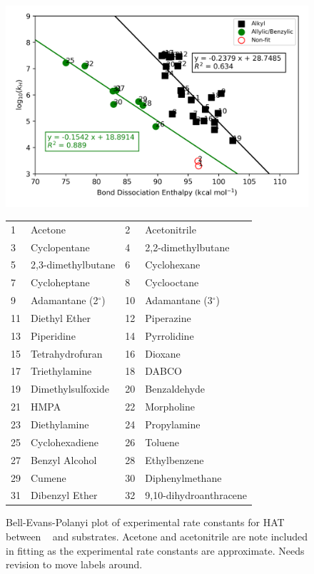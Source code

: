 \begin{figure}[htb]
  \centering
  \includegraphics[width=\textwidth]{figures/bde-bep}
\begin{tabularx}{\textwidth}{| l X l X |}
  \hline
  1 & Acetone & 2 & Acetonitrile \\
  3 & Cyclopentane & 4 & 2,2-dimethylbutane \\
  5 & 2,3-dimethylbutane & 6 & Cyclohexane \\
  7 & Cycloheptane & 8 & Cyclooctane \\
  9 & Adamantane (2$^\circ$) & 10 & Adamantane (3$^\circ$) \\
  11 & Diethyl Ether & 12 & Piperazine \\
  13 & Piperidine & 14 & Pyrrolidine \\
  15 & Tetrahydrofuran & 16 & Dioxane \\
  17 & Triethylamine & 18 & DABCO \\
  19 & Dimethylsulfoxide & 20 & Benzaldehyde \\
  21 & HMPA & 22 & Morpholine \\
  23 & Diethylamine & 24 & Propylamine \\
  25 & Cyclohexadiene & 26 & Toluene \\
  27 & Benzyl Alcohol & 28 & Ethylbenzene \\
  29 & Cumene & 30 & Diphenylmethane \\
  31 & Dibenzyl Ether & 32 & 9,10-dihydroanthracene \\
  \hline
\end{tabularx}
  \caption{Bell-Evans-Polanyi plot of experimental rate constants for HAT between \cumo~ and substrates. Acetone and acetonitrile are note included in fitting as the experimental rate constants are approximate. Needs revision to move labels around.}
  \label{bde-bep}
\end{figure}



